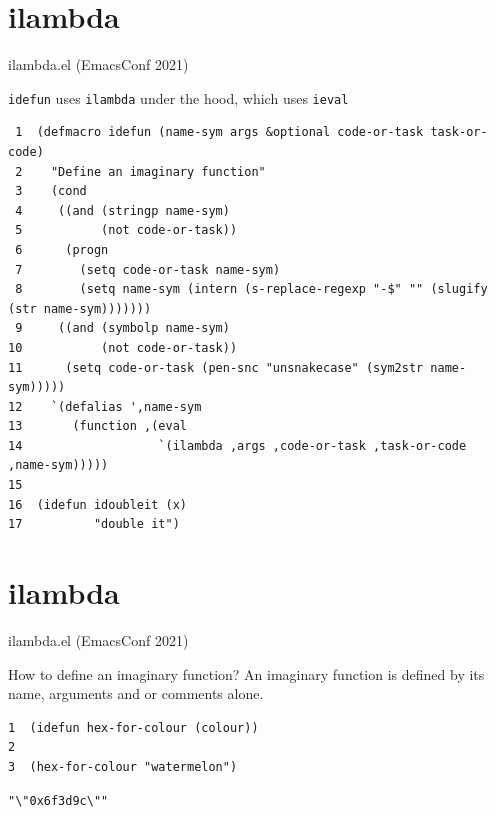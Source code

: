 \documentclass[presentation]{beamer}
\begin{document}
\section{ilambda}
\label{sec:org4a271a6}
\begin{frame}[label={sec:org9c73d67},fragile]{ilambda.el (EmacsConf 2021)}
 \begin{block}{\texttt{idefun} uses \texttt{ilambda} under the hood, which uses \texttt{ieval}}
{\tiny
\begin{verbatim}
 1  (defmacro idefun (name-sym args &optional code-or-task task-or-code)
 2    "Define an imaginary function"
 3    (cond
 4     ((and (stringp name-sym)
 5           (not code-or-task))
 6      (progn
 7        (setq code-or-task name-sym)
 8        (setq name-sym (intern (s-replace-regexp "-$" "" (slugify (str name-sym)))))))
 9     ((and (symbolp name-sym)
10           (not code-or-task))
11      (setq code-or-task (pen-snc "unsnakecase" (sym2str name-sym)))))
12    `(defalias ',name-sym
13       (function ,(eval
14                   `(ilambda ,args ,code-or-task ,task-or-code ,name-sym)))))
15  
16  (idefun idoubleit (x)
17          "double it")
\end{verbatim}
}
\end{block}
\end{frame}

\section{ilambda}
\label{sec:org64535fa}
\begin{frame}[label={sec:org2e63f75},fragile]{ilambda.el (EmacsConf 2021)}
 \begin{block}{How to define an imaginary function?}
An imaginary function is defined by its name,
arguments and or comments alone.

{\tiny
\begin{verbatim}
1  (idefun hex-for-colour (colour))
2  
3  (hex-for-colour "watermelon")
\end{verbatim}
}

\begin{verbatim}
"\"0x6f3d9c\""
\end{verbatim}
\end{block}
\end{frame}
\end{document}
